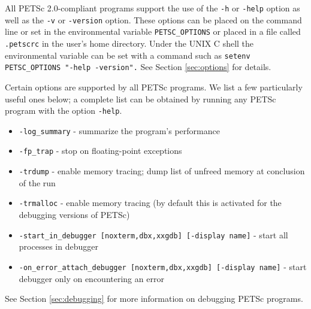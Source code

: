 All PETSc 2.0-compliant programs support the use of the {\tt -h}
 or {\tt -help} option as well as the {\tt -v} 
or {\tt -version} option. These options can be placed on the
  command line or set in the
environmental variable {\tt PETSC\_OPTIONS} or placed in a file called
{\tt .petscrc} in the user's home directory.  Under the UNIX C shell
the environmental variable can be set 
 with a command such as {\tt setenv PETSC\_OPTIONS
"-help -version".}  See Section \ref{sec:options} for details.


Certain options are supported by all PETSc programs.  We list a few 
particularly useful ones below; a complete list can be obtained by 
running any PETSc program with the option {\tt -help}.
\begin{itemize}
\item {\tt -log\_summary} - summarize the program's performance
\item {\tt -fp\_trap} - stop on floating-point exceptions 
\item {\tt -trdump} - enable memory tracing; dump list of unfreed memory 
      at conclusion  of the run
\item {\tt -trmalloc} - enable memory tracing (by default this is 
      activated for the debugging versions of PETSc)
\item {\tt -start\_in\_debugger [noxterm,dbx,xxgdb] [-display name]} 
     - start all processes in debugger
\item {\tt -on\_error\_attach\_debugger [noxterm,dbx,xxgdb]
      [-display name]} - start debugger only on encountering an error
\end{itemize}
See Section \ref{sec:debugging} for more information on debugging PETSc programs.

